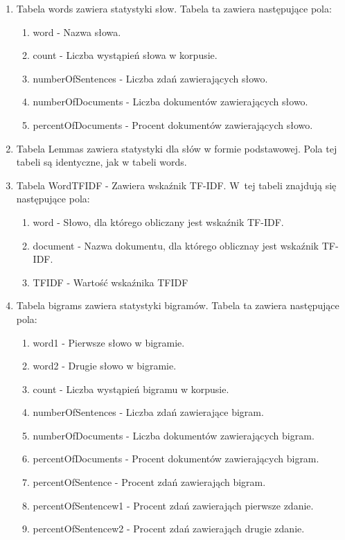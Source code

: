 \documentclass[11pt]{article}
\begin{document}
\begin{enumerate}
 \item Tabela words zawiera statystyki słow. Tabela ta zawiera następujące pola:
  \begin{enumerate}
    \item word - Nazwa słowa.
    \item count - Liczba wystąpień słowa w korpusie.
    \item numberOfSentences - Liczba zdań zawierających słowo.
    \item numberOfDocuments - Liczba dokumentów zawierających słowo.
    \item percentOfDocuments - Procent dokumentów zawierających słowo.
  \end{enumerate}
  \item Tabela Lemmas zawiera statystyki dla słów w formie podstawowej. Pola tej tabeli są identyczne, jak w tabeli words.
  \item Tabela WordTFIDF - Zawiera wskaźnik TF-IDF. W~tej tabeli znajdują się następujące pola:
  \begin{enumerate}
    \item word - Słowo, dla którego obliczany jest wskaźnik TF-IDF.
    \item  document - Nazwa dokumentu, dla którego oblicznay jest wskaźnik TF-IDF.
    \item TFIDF - Wartość wskaźnika TFIDF
  \end{enumerate}
  \item Tabela bigrams zawiera statystyki bigramów. Tabela ta zawiera następujące pola:
  \begin{enumerate}
     \item word1 - Pierwsze słowo w bigramie.
     \item word2 - Drugie słowo w bigramie.
     \item count - Liczba wystąpień bigramu w korpusie.
     \item numberOfSentences  - Liczba zdań zawierające bigram.
     \item numberOfDocuments - Liczba dokumentów zawierających bigram.
     \item percentOfDocuments  - Procent dokumentów zawierających bigram.
     \item percentOfSentence  -  Procent zdań zawierająch bigram.
     \item percentOfSentencew1 - Procent zdań zawierająch pierwsze zdanie.
     \item percentOfSentencew2 - Procent zdań zawierająch drugie zdanie.

\end{enumerate}
\end{enumerate}
\end{document}
